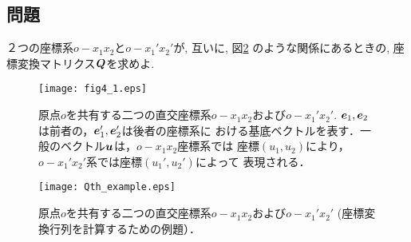 \documentclass[10pt,a4j]{jbook}
\begin{document}
\subsection{問題}
２つの座標系$o-x_1x_2$と$o-x_1'x_2'$が, 互いに, 図\ref{fig:Qth_example}
のような関係にあるときの, 座標変換マトリクス$\mbox{\boldmath $Q$}$を求めよ. 
\begin{figure}[h]
	\begin{center}
	\texttt{[image: fig4\_1.eps]} 
	\end{center}
	\caption{原点$o$を共有する二つの直交座標系$o-x_1x_2$および$o-x_1'x_2'$. 
	$\mbox{\boldmath $e$}_1, \mbox{\boldmath $e$}_2$は前者の，$\mbox{\boldmath $e$}_1', \mbox{\boldmath $e$}_2'$は後者の座標系に
	おける基底ベクトルを表す．一般のベクトル$\mbox{\boldmath $u$}$は，$o-x_1x_2$座標系では
	座標$(u_1, u_2)$により，$o-x_1'x_2'$系では座標$(u_1', u_2')$によって
	表現される．}
	\label{fig:fig4_3}
\end{figure}
\begin{figure}[h]
	\begin{center}
	\texttt{[image: Qth\_example.eps]} 
	\end{center}
	\caption{原点$o$を共有する二つの直交座標系$o-x_1x_2$および$o-x_1'x_2'$ 
	(座標変換行列を計算するための例題）．}
	\label{fig:Qth_example}
\end{figure}
\end{document}
